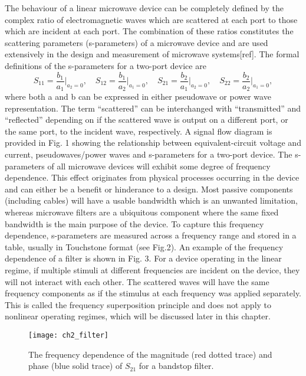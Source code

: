 \documentclass[../thesis.tex]{subfiles}
\begin{document}
\begin{refsection}
The behaviour of a linear microwave device can be completely defined by the complex ratio of electromagnetic waves which are scattered at each port to those which are incident at each port. The combination of these ratios constitutes the scattering parameters (s-parameters) of a microwave device and are used extensively in the design and measurement of microwave systems[ref]. The formal definitions of the s-parameters for a two-port device are
\begin{equation}
S_{11}=\dfrac{b_1}{a_1}\bigg\rvert_{a_2=0},\quad
S_{12}=\dfrac{b_1}{a_2}\bigg\rvert_{a_1=0},\quad
S_{21}=\dfrac{b_2}{a_1}\bigg\rvert_{a_2=0},\quad
S_{22}=\dfrac{b_2}{a_2}\bigg\rvert_{a_1=0},
\end{equation}
where both a and b can be expressed in either pseudowave or power wave representation. The term “scattered” can be interchanged with “transmitted” and “reflected” depending on if the scattered wave is output on a different port, or the same port, to the incident wave, respectively. A signal flow diagram is provided in Fig. 1 showing the relationship between equivalent-circuit voltage and current, pseudowaves/power waves and s-parameters for a two-port device.
The s-parameters of all microwave devices will exhibit some degree of frequency dependence. This effect originates from physical processes occurring in the device and can either be a benefit or hinderance to a design. Most passive components (including cables) will have a usable bandwidth which is an unwanted limitation, whereas microwave filters are a ubiquitous component where the same fixed bandwidth is the main purpose of the device. To capture this frequency dependence, s-parameters are measured across a frequency range and stored in a table, usually in Touchstone format (see Fig.2). An example of the frequency dependence of a filter is shown in Fig. 3. For a device operating in the linear regime, if multiple stimuli at different frequencies are incident on the device, they will not interact with each other. The scattered waves will have the same frequency components as if the stimulus at each frequency was applied separately. This is called the frequency superposition principle and does not apply to nonlinear operating regimes, which will be discussed later in this chapter.

\begin{figure}
	\centering
	\texttt{[image: ch2\_filter]}
	\caption{The frequency dependence of the magnitude (red dotted trace) and phase (blue solid trace) of $S_{21}$ for a bandstop filter.}
	\label{ch2_filter}
\end{figure}


\end{refsection}
\end{document}
